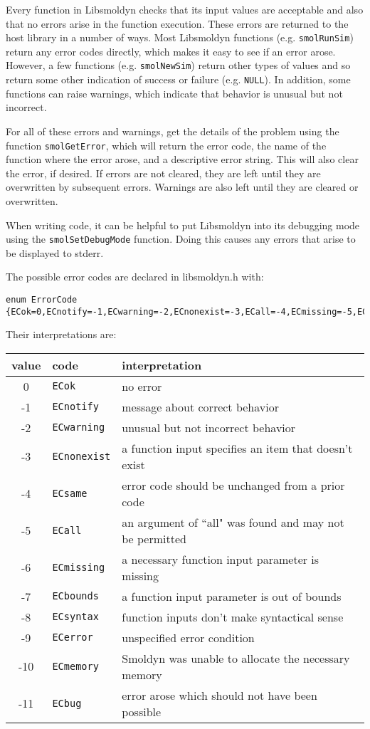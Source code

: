 \documentclass {book}
\begin{document}
Every function in Libsmoldyn checks that its input values are acceptable and also that no errors arise in the function execution. These errors are returned to the host library in a number of ways. Most Libsmoldyn functions (e.g. \texttt{smolRunSim}) return any error codes directly, which makes it easy to see if an error arose. However, a few functions (e.g. \texttt{smolNewSim}) return other types of values and so return some other indication of success or failure (e.g. \texttt{NULL}). In addition, some functions can raise warnings, which indicate that behavior is unusual but not incorrect.

For all of these errors and warnings, get the details of the problem using the function \texttt{smolGetError}, which will return the error code, the name of the function where the error arose, and a descriptive error string. This will also clear the error, if desired. If errors are not cleared, they are left until they are overwritten by subsequent errors. Warnings are also left until they are cleared or overwritten.

When writing code, it can be helpful to put Libsmoldyn into its debugging mode using the \texttt{smolSetDebugMode} function. Doing this causes any errors that arise to be displayed to stderr.

The possible error codes are declared in libsmoldyn.h with:

\begin{lstlisting}
enum ErrorCode {ECok=0,ECnotify=-1,ECwarning=-2,ECnonexist=-3,ECall=-4,ECmissing=-5,ECbounds=-6,ECsyntax=-7,ECerror=-8,ECmemory=-9,ECbug=-10,ECsame=-11};
\end{lstlisting}

Their interpretations are:

\begin{longtable}[c]{cll}
value & code & interpretation\\
\hline
0 & \texttt{ECok} & no error\\
-1 & \texttt{ECnotify} & message about correct behavior\\
-2 & \texttt{ECwarning} & unusual but not incorrect behavior\\
-3 & \texttt{ECnonexist} & a function input specifies an item that doesn't exist\\
-4 & \texttt{ECsame} & error code should be unchanged from a prior code\\
-5 & \texttt{ECall} & an argument of ``all" was found and may not be permitted\\
-6 & \texttt{ECmissing} & a necessary function input parameter is missing\\
-7 & \texttt{ECbounds} & a function input parameter is out of bounds\\
-8 & \texttt{ECsyntax} & function inputs don't make syntactical sense\\
-9 & \texttt{ECerror} & unspecified error condition\\
-10 & \texttt{ECmemory} & Smoldyn was unable to allocate the necessary memory\\
-11 & \texttt{ECbug} & error arose which should not have been possible\\

\end{longtable}
\end{document}

